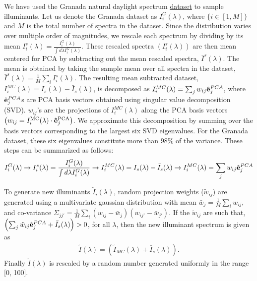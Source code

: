 \documentclass{jov}
\begin{document}
We have used the Granada natural daylight spectrum \href{http://colorimaginglab.ugr.es/pages/Data}{dataset} \cite{peyvandi2016colorimetric} to sample illuminants. Let us denote the Granada dataset as $I^G_i(\lambda)$, where $\{i \in [1,M]\}$ and $M$ is the total number of spectra in the dataset. Since the distribution varies over multiple order of magnitudes, we rescale each spectrum by dividing by its mean $I_i^s(\lambda) = \frac{I^G_i(\lambda)}{\int d\lambda I^G_i(\lambda)}$. These rescaled spectra $(I_i^s(\lambda))$ are then mean centered for PCA by subtracting out the mean 
rescaled spectra, $\bar{I}^{s}(\lambda)$. The mean is obtained
by taking the sample mean over all spectra in the dataset, $\bar{I}^{s}(\lambda) = \frac{1}{M}\sum_i{I_i^s(\lambda)}$. 
The resulting mean subtracted dataset, $I_i^{MC}(\lambda) = I_{s}(\lambda) - \bar{I}_{s}(\lambda)$, 
is decomposed as $I_i^{MC}(\lambda) = \sum_j w_{ij}\hat{{\bf e}}_j^{PCA}$, 
where $\hat{{\bf e}}_j^{PCA}$s are PCA basis vectors obtained using 
singular value decomposition (SVD). $w_{ij}$'s are the projections 
of $I_i^{MC}(\lambda)$ along the PCA basis vectors $\left( w_{ij} = I_i^{\rm MC}(\lambda)\cdot {\bf \hat{e}}_j^{\rm PCA}\right)$. We approximate 
this decomposition by summing over the basis vectors corresponding to
the largest six SVD eigenvalues. For the Granada dataset, these six 
eigenvalues constitute more than $98\%$ of the variance. These steps
can be summarized as follows:
\begin{align}
I^G_i(\lambda) \rightarrow I_i^s(\lambda) = \frac{I^G_i(\lambda)}{\int d\lambda I^G_i(\lambda)} \rightarrow I_i^{MC}(\lambda) = I_{s}(\lambda) - \bar{I}_{s}(\lambda) \rightarrow I_i^{MC}(\lambda) = \sum_j w_{ij}\hat{{\bf e}}_j^{PCA}
\end{align}

To generate new illuminants $\tilde{I}_i(\lambda)$, random 
projection weights ($\tilde{w}_{ij}$) are generated using a multivariate 
gaussian distribution with mean $\bar{w}_j = \frac{1}{M}\sum_i w_{ij}$, 
and co-variance $\Sigma_{jj'} = \frac{1}{M} \sum_i \left(w_{ij} -\bar{w}_j\right)\left(w_{ij'} -\bar{w}_{j'}\right) $. If the $\tilde{w}_{ij}$ are such that, $\left( \sum_j \tilde{w}_{ij} \hat{{\bf e}}_j^{PCA} +  \bar{I}_{s} (\lambda)\right) > 0$, for all $\lambda$, then the new illuminant spectrum is given as 
\begin{align}
\tilde{I}(\lambda) = \left( \tilde{I}_{MC}(\lambda) + \bar{I}_{s}(\lambda)\right).
\end{align}
Finally $\tilde{I}(\lambda)$ is rescaled by a random number generated uniformly in the range [0, 100].
\end{document}
